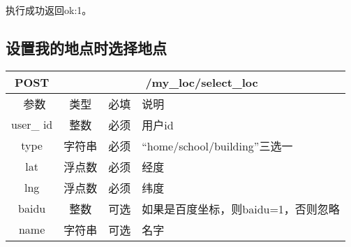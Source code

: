 执行成功返回{ok:1}。


\subsection{设置我的地点时选择地点}

\begin{table}[H]
   \begin{center}
\begin{tabular}{|c|c|c|p{12cm}|}
\hline
POST & \multicolumn{3}{|c|}{/my\_loc/select\_loc} \\
\hline\hline
 \  参数  & 类型 & 必填 &  说明  \\
\hline
user\_ id  & 整数 & 必须 &  用户id\\
\hline
type  & 字符串 & 必须 &  “home/school/building”三选一\\
\hline
 lat  & 浮点数 & 必须 & 经度\\
\hline
 lng  &  浮点数 & 必须 & 纬度\\  
\hline
 baidu  & 整数 & 可选 & 如果是百度坐标，则baidu=1，否则忽略\\  
 \hline
 name  & 字符串 & 可选 & 名字\\  
 \hline 
\end{tabular}
   \end{center}
\end{table}

